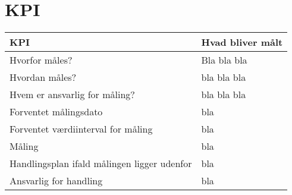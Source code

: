 \section{KPI}
\begin{center}
    \begin{tabular}{| p{5cm} | p{5cm} |}
    \hline
    \textbf{KPI} & \textbf{Hvad bliver målt} \\ \hline 
    Hvorfor måles? & Bla bla bla \\ \hline
    Hvordan måles? & bla bla bla \\ \hline
    Hvem er ansvarlig for måling? & bla bla bla \\ \hline
    Forventet målingsdato & bla \\ \hline
    Forventet værdiinterval for måling & bla \\ \hline
    Måling & bla \\ \hline
    Handlingsplan ifald målingen ligger udenfor & bla \\ \hline
    Ansvarlig for handling & bla \\ \hline
    \end{tabular}
\end{center}
